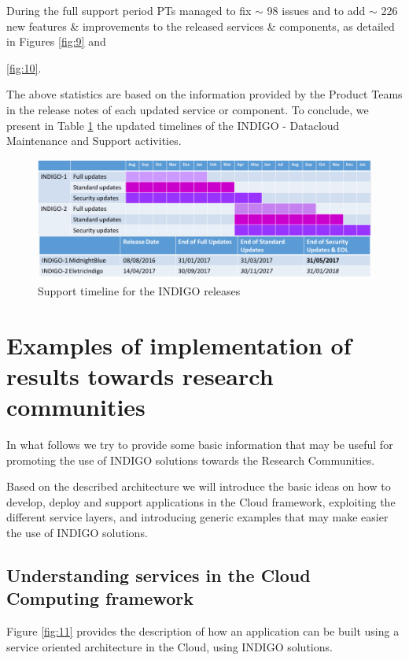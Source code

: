 \documentclass{article}
\begin{document}
During the full support period PTs managed to fix $\sim$ 98 issues and to add $\sim$ 226 new features \& improvements to the released services \& components, as detailed in Figures \ref{fig:9} and {\ref{fig:10}.

The above statistics are based on the information provided by the Product Teams in the release notes of each updated service or component. To conclude, we present in Table \ref{tab:3} the updated timelines of the INDIGO - Datacloud Maintenance and Support activities.


\begin{figure}
  \centering
  \includegraphics[width=\textwidth]{./figs/TableIII.pdf}
  \caption{Support timeline for the INDIGO releases}
  \label{tab:3}
\end{figure}





\section{Examples of implementation of results towards research communities}
\label{sec:examples}

In what follows we try to provide some basic information that may be useful for promoting the use of INDIGO solutions towards the Research Communities.

Based on the described architecture we will introduce the basic ideas on how to develop, deploy and support applications in the Cloud framework, exploiting the different service layers, and introducing generic examples that may make easier the use of INDIGO solutions.   



\subsection{Understanding services in the Cloud Computing framework}

Figure \ref{fig:11} provides the description of how an application can be built using a service oriented architecture in the Cloud, using INDIGO solutions. 

}
\end{document}
